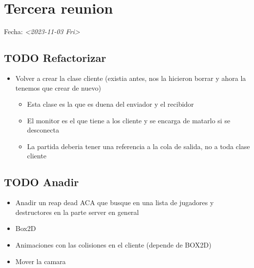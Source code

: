 \documentclass[11pt]{article}
\date{\today}
\title{}
\begin{document}
\tableofcontents

\section{Tercera reunion}
\label{sec:orga00f395}
Fecha: \textit{<2023-11-03 Fri>}

\subsection{{\bfseries\sffamily TODO} Refactorizar}
\label{sec:org56e3a3a}
\begin{itemize}
\item Volver a crear la clase cliente (existia antes, nos la hicieron borrar y ahora la tenemos que crear de nuevo)
\begin{itemize}
\item Esta clase es la que es duena del enviador y el recibidor
\item El monitor es el que tiene a los cliente y se encarga de matarlo si se desconecta
\item La partida deberia tener una referencia a la cola de salida, no a toda clase cliente
\end{itemize}
\end{itemize}

\subsection{{\bfseries\sffamily TODO} Anadir}
\label{sec:orgbb259dc}
\begin{itemize}
\item Anadir un reap dead ACA que busque en una lista de jugadores y destructores en la parte server en general
\item Box2D
\item Animaciones con las colisiones en el cliente (depende de BOX2D)
\item Mover la camara
\end{itemize}
\end{document}

